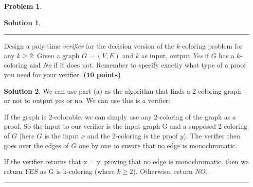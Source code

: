 \documentclass{article}
\theoremstyle{definition}
\newtheorem{problem}{Problem}
\def\fline{\rule{0.75\linewidth}{0.5pt}}
\newcommand{\finishline}{\begin{center}\fline\end{center}}
\newtheorem*{solution*}{Solution}
\newenvironment{solution}{\begin{solution*}}{{\finishline} \end{solution*}}
\newcommand{\grade}[1]{\hfill{\textbf{($\mathbf{#1}$ points)}}}
\begin{document}
\begin{problem}
\begin{itemize}
\begin{solution}
\end{solution}

		\medskip
		
		\item[(b)] Design a poly-time \emph{verifier} for the decision version of the $k$-coloring problem for any $k \geq 2$: Given a graph $G=(V,E)$ and $k$ as input, output \emph{Yes} if $G$ has a $k$-coloring and \emph{No} if it does not. Remember to specify exactly what type of a proof you need 
		for your verifier. \grade{10}
		
\begin{solution}
	\item We can use part (a) as the algorithm that finds a 2-coloring graph or not to output yes or no. We can use this is a verifier:
	\item If the graph is 2-colorable, we can simply use any 2-coloring of the graph as a proof. So the input to our verifier is the input graph G and a supposed 2-coloring of $G$ (here $G$ is the input $x$ and the 2-coloring is the proof $y$).  The verifier then goes over the edges of $G$ one by one to ensure that no edge is monochromatic.
	\item If the verifier returns that x = y, proving that no edge is monochromatic, then we return $YES$ as G is k-coloring (where $k \geq 2$). Otherwise, return $NO$.
\end{solution}

	\end{itemize}
\end{problem}




\bigskip
\end{document}
